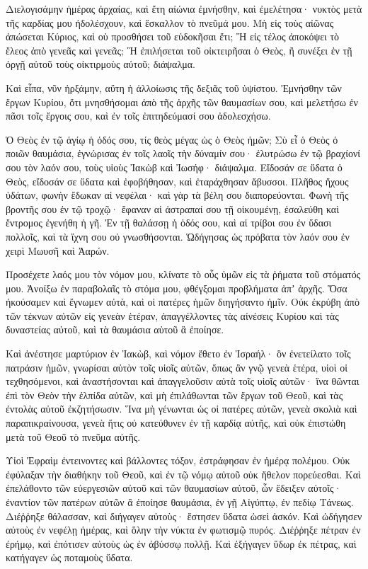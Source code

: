\begin{spacing}{1.1}
\begin{multicols}{2}
Διελογισάμην ἡμέρας ἀρχαίας, καὶ ἔτη αἰώνια
ἐμνήσθην, καὶ ἐμελέτησα· νυκτὸς μετὰ τῆς καρδίας μου ἠδολέσχουν, καὶ ἔσκαλλον τὸ πνεῦμά μου.
Μὴ εἰς τοὺς αἰῶνας ἀπώσεται Κύριος, καὶ οὐ προσθήσει τοῦ εὐδοκῆσαι ἔτι;
Ἢ εἰς τέλος ἀποκόψει τὸ ἔλεος ἀπὸ γενεᾶς καὶ γενεᾶς;
Ἢ ἐπιλήσεται τοῦ οἰκτειρῆσαι ὁ Θεὸς, ἢ συνέξει ἐν τῇ ὀργῇ αὐτοῦ τοὺς οἰκτιρμοὺς αὐτοῦ; διάψαλμα.

Καὶ εἶπα, νῦν ἠρξάμην, αὕτη ἡ ἀλλοίωσις τῆς δεξιᾶς τοῦ ὑψίστου.
Ἐμνήσθην τῶν ἔργων Κυρίου, ὅτι μνησθήσομαι ἀπὸ τῆς ἀρχῆς τῶν θαυμασίων σου,
καὶ μελετήσω ἐν πᾶσι τοῖς ἔργοις σου, καὶ ἐν τοῖς ἐπιτηδεύμασί σου ἀδολεσχήσω.

Ὁ Θεὸς ἐν τῷ ἁγίῳ ἡ ὁδός σου, τίς θεὸς μέγας ὡς ὁ Θεὸς ἡμῶν;
Σὺ εἶ ὁ Θεὸς ὁ ποιῶν θαυμάσια, ἐγνώρισας ἐν τοῖς λαοῖς τὴν δύναμίν σου·
ἐλυτρώσω ἐν τῷ βραχίονί σου τὸν λαόν σου, τοὺς υἱοὺς Ἰακὼβ καὶ Ἰωσήφ· διάψαλμα.
Εἴδοσάν σε ὕδατα ὁ Θεὸς, εἴδοσάν σε ὕδατα καὶ ἐφοβήθησαν, καὶ ἐταράχθησαν ἄβυσσοι.
Πλῆθος ἤχους ὑδάτων, φωνὴν ἔδωκαν αἱ νεφέλαι· καὶ γὰρ τὰ βέλη σου διαπορεύονται.
Φωνὴ τῆς βροντῆς σου ἐν τῷ τροχῷ· ἔφαναν αἱ ἀστραπαί σου τῇ οἰκουμένῃ, ἐσαλεύθη καὶ ἔντρομος ἐγενήθη ἡ γῆ.
Ἐν τῇ θαλάσσῃ ἡ ὁδός σου, καὶ αἱ τρίβοι σου ἐν ὕδασι πολλοῖς, καὶ τὰ ἴχνη σου οὐ γνωσθήσονται.
Ὡδήγησας ὡς πρόβατα τὸν λαόν σου ἐν χειρὶ Μωυσῆ καὶ Ἀαρών.

Προσέχετε λαός μου τὸν νόμον μου, κλίνατε τὸ οὖς ὑμῶν εἰς τὰ ῥήματα τοῦ στόματός μου.
Ἀνοίξω ἐν παραβολαῖς τὸ στόμα μου, φθέγξομαι προβλήματα ἀπʼ ἀρχῆς.
Ὅσα ἠκούσαμεν καὶ ἔγνωμεν αὐτὰ, καὶ οἱ πατέρες ἡμῶν διηγήσαντο ἡμῖν.
Οὐκ ἐκρύβη ἀπὸ τῶν τέκνων αὐτῶν εἰς γενεὰν ἑτέραν, ἀπαγγέλλοντες τὰς αἰνέσεις Κυρίου καὶ τὰς δυναστείας αὐτοῦ, καὶ τὰ θαυμάσια αὐτοῦ ἃ ἐποίησε.

Καὶ ἀνέστησε μαρτύριον ἐν Ἰακὼβ, καὶ νόμον ἔθετο ἐν Ἰσραήλ· ὃν ἐνετείλατο τοῖς πατράσιν ἡμῶν, γνωρίσαι αὐτὸν τοῖς υἱοῖς αὐτῶν,
ὅπως ἂν γνῷ γενεὰ ἑτέρα, υἱοὶ οἱ τεχθησόμενοι, καὶ ἀναστήσονται καὶ ἀπαγγελοῦσιν αὐτὰ τοῖς υἱοῖς αὐτῶν·
ἵνα θῶνται ἐπὶ τὸν Θεὸν τὴν ἐλπίδα αὐτῶν, καὶ μὴ ἐπιλάθωνται τῶν ἔργων τοῦ Θεοῦ, καὶ τὰς ἐντολὰς αὐτοῦ ἐκζητήσωσιν.
Ἵνα μὴ γένωνται ὡς οἱ πατέρες αὐτῶν, γενεὰ σκολιὰ καὶ παραπικραίνουσα, γενεὰ ἥτις οὐ κατεύθυνεν ἐν τῇ καρδίᾳ αὐτῆς, καὶ οὐκ ἐπιστώθη μετὰ τοῦ Θεοῦ τὸ πνεῦμα αὐτῆς.

Υἱοὶ Ἐφραὶμ ἐντεινοντες καὶ βάλλοντες τόξον, ἐστράφησαν ἐν ἡμέρᾳ πολέμου.
Οὐκ ἐφύλαξαν τὴν διαθήκην τοῦ Θεοῦ, καὶ ἐν τῷ νόμῳ αὐτοῦ οὐκ ἤθελον πορεύεσθαι.
Καὶ ἐπελάθοντο τῶν εὐεργεσιῶν αὐτοῦ καὶ τῶν θαυμασίων αὐτοῦ, ὧν ἔδειξεν αὐτοῖς·
ἐναντίον τῶν πατέρων αὐτῶν ἃ ἐποίησε θαυμάσια, ἐν γῇ Αἰγύπτῳ, ἐν πεδίῳ Τάνεως.
Διέῤῥηξε θάλασσαν, καὶ διήγαγεν αὐτοὺς· ἔστησεν ὕδατα ὡσεὶ ἀσκόν.
Καὶ ὡδήγησεν αὐτοὺς ἐν νεφέλῃ ἡμέρας, καὶ ὅλην τὴν νύκτα ἐν φωτισμῷ πυρός.
Διέῤῥηξε πέτραν ἐν ἐρήμῳ, καὶ ἐπότισεν αὐτοὺς ὡς ἐν ἀβύσσῳ πολλῇ.
Καὶ ἐξήγαγεν ὕδωρ ἐκ πέτρας, καὶ κατήγαγεν ὡς ποταμοὺς ὕδατα.


\end{multicols}
\end{spacing}
